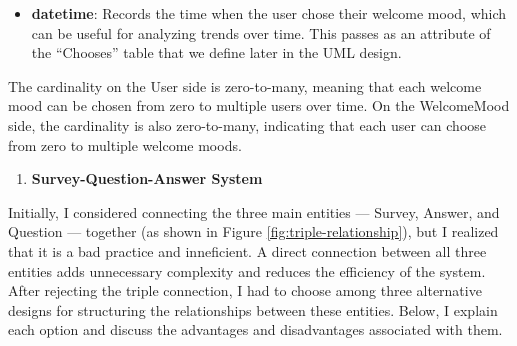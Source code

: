 \begin{itemize}
    \item \textbf{datetime}: Records the time when the user chose their welcome mood, which can be useful for analyzing trends over time. This passes as an attribute of the ``Chooses'' table that we define later in the UML design.
\end{itemize}

\noindent The cardinality on the User side is zero-to-many, meaning that each welcome mood can be chosen from zero to multiple users over time. On the WelcomeMood side, the cardinality is also zero-to-many, indicating that each user can choose from zero to multiple welcome moods.

\vspace{5mm}

\begin{enumerate}
    \item \textbf{Survey-Question-Answer System}
\end{enumerate}

\noindent Initially, I considered connecting the three main entities — Survey, Answer, and Question — together (as shown in Figure \ref{fig:triple-relationship}), but I realized that it is a bad practice and inneficient. A direct connection between all three entities adds unnecessary complexity and reduces the efficiency of the system. After rejecting the triple connection, I had to choose among three alternative designs for structuring the relationships between these entities. Below, I explain each option and discuss the advantages and disadvantages associated with them.

\vspace{5mm}

